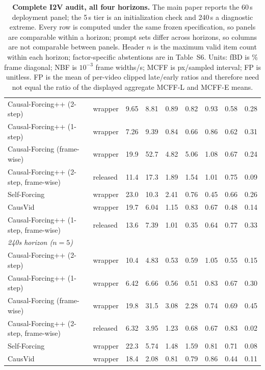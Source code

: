 \begin{table}[!tb]
\begin{tabular}{llccccccc}
Causal-Forcing++ (2-step) & wrapper & 9.65 & 8.81 & 0.89 & 0.82 & 0.93 & 0.58 & 0.28 \\
Causal-Forcing++ (1-step) & wrapper & 7.26 & 9.39 & 0.84 & 0.66 & 0.86 & 0.62 & 0.31 \\
Causal-Forcing (frame-wise) & wrapper & 19.9 & 52.7 & 4.82 & 5.06 & 1.08 & 0.67 & 0.24 \\
Causal-Forcing++ (2-step, frame-wise) & released & 11.4 & 17.3 & 1.89 & 1.54 & 1.01 & 0.75 & 0.09 \\
Self-Forcing & wrapper & 23.0 & 10.3 & 2.41 & 0.76 & 0.45 & 0.66 & 0.26 \\
CausVid & wrapper & 19.7 & 6.04 & 1.15 & 0.83 & 0.67 & 0.48 & 0.14 \\
Causal-Forcing++ (1-step, frame-wise) & released & 13.6 & 7.39 & 1.01 & 0.35 & 0.64 & 0.77 & 0.33 \\
\midrule
\multicolumn{9}{l}{\textit{240s horizon  ($n=5$)}} \\
Causal-Forcing++ (2-step) & wrapper & 10.4 & 4.83 & 0.53 & 0.59 & 1.05 & 0.55 & 0.15 \\
Causal-Forcing++ (1-step) & wrapper & 6.42 & 6.66 & 0.56 & 0.51 & 0.83 & 0.67 & 0.30 \\
Causal-Forcing (frame-wise) & wrapper & 19.8 & 31.5 & 3.08 & 2.28 & 0.74 & 0.69 & 0.45 \\
Causal-Forcing++ (2-step, frame-wise) & released & 6.32 & 3.95 & 1.23 & 0.68 & 0.67 & 0.83 & 0.02 \\
Self-Forcing & wrapper & 22.3 & 5.74 & 1.48 & 1.59 & 0.81 & 0.71 & 0.08 \\
CausVid & wrapper & 18.4 & 2.08 & 0.81 & 0.79 & 0.86 & 0.44 & 0.11 \\
\bottomrule
\end{tabular}
\caption{\textbf{Complete I2V audit, all four horizons.} The main paper reports the 60\,s deployment panel; the 5\,s tier is an initialization check and 240\,s a diagnostic extreme. Every row is computed under the same frozen specification, so panels are comparable within a horizon; prompt sets differ across horizons, so columns are not comparable between panels. Header $n$ is the maximum valid item count within each horizon; factor-specific abstentions are in Table~S6. Units: fBD is \% frame diagonal; NBF is $10^{-3}$ frame widths/s; MCFF is px/sampled interval; FP is unitless. FP is the mean of per-video clipped late/early ratios and therefore need not equal the ratio of the displayed aggregate MCFF-L and MCFF-E means.}
\label{tab:i2v_audit_full}
\end{table}